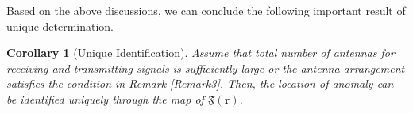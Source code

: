\documentclass[3p,10pt]{elsarticle}
\newcommand{\ma}{\mathbf{a}}
\newcommand{\mb}{\mathbf{b}}
\newcommand{\mr}{\mathbf{r}}
\newcommand{\vt}{\boldsymbol{\theta}}
\newcommand{\vv}{\boldsymbol{\vartheta}}
\DeclareMathOperator*{\tx}{TX}
\DeclareMathOperator*{\rx}{RX}
\theoremstyle{plain}
\newtheorem{corollary}[theorem]{Corollary}
\theoremstyle{remark}
\begin{document}
Based on the above discussions, we can conclude the following important result of unique determination.

\begin{corollary}[Unique Identification]
Assume that total number of antennas for receiving and transmitting signals is sufficiently large or the antenna arrangement satisfies the condition in Remark \ref{Remark3}. Then, the location of anomaly can be identified
uniquely through the map of $\mathfrak{F}(\mr)$.
\end{corollary}

%
\end{document}
